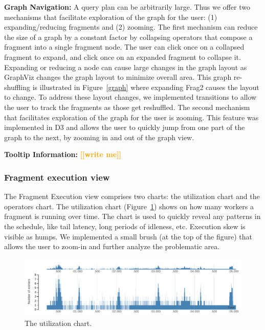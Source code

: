 \documentclass{chi2009}
\newcommand*{\fragment}{Fragment Execution\xspace}
\newcommand{\todo}[1]{\textsf{\textbf{\textcolor{Orange}{[[#1]]}}}}
\begin{document}
\textbf{Graph Navigation:} A query plan can be arbitrarily large. Thus we offer two mechanisms that facilitate exploration of the graph for the user: (1) expanding/reducing fragments and (2) zooming. The first mechanism can reduce the size of a graph by a constant factor by collapsing operators that compose a fragment into a single fragment node. The user can click once on a collapsed fragment to expand, and click once on an expanded fragment to collapse it. Expanding or reducing a node can cause large changes in the graph layout as GraphViz changes the graph layout to minimize overall area. This graph re-shuffling is illustrated in Figure~\ref{graph} where expanding Frag2 causes the layout to change. To address these layout changes, we implemented transitions to allow the user to track the fragments as those get reshuffled. The second mechanism that facilitates exploration of the graph for the user is zooming. This feature was implemented in D3 and allows the user to quickly jump from one part of the graph to the next, by zooming in and out of the graph view.

\textbf{Tooltip Information:} \todo{write me}


\subsubsection{Fragment execution view}
\label{sec:fragment}


The \fragment view comprises two charts: the utilization chart and the
operators chart. The utilization chart (Figure~\ref{fig:utilization_chart}) shows on
how many workers a fragment is running over time. The chart is used to
quickly reveal any patterns in the schedule, like tail latency, long periods of
idleness, etc. Execution skew is visible as humps.
We implemented a small brush (at the top of the figure) that
allows the user to zoom-in and further analyze the problematic area.

\begin{figure}[ht]
  \includegraphics[width=\columnwidth]{images/utilization_chart}
  \caption{The utilization chart. }
  \label{fig:utilization_chart}
\end{figure}
\end{document}
